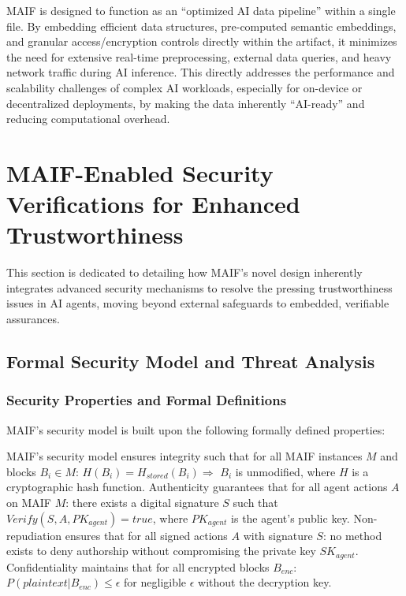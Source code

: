 \documentclass[conference]{IEEEtran}
\begin{document}
MAIF is designed to function as an ``optimized AI data pipeline'' within a single file. By embedding efficient data structures, pre-computed semantic embeddings, and granular access/encryption controls directly within the artifact, it minimizes the need for extensive real-time preprocessing, external data queries, and heavy network traffic during AI inference. This directly addresses the performance and scalability challenges of complex AI workloads, especially for on-device or decentralized deployments, by making the data inherently ``AI-ready'' and reducing computational overhead.

\section{MAIF-Enabled Security Verifications for Enhanced Trustworthiness}
\label{sec:security}

This section is dedicated to detailing how MAIF's novel design inherently integrates advanced security mechanisms to resolve the pressing trustworthiness issues in AI agents, moving beyond external safeguards to embedded, verifiable assurances.

\subsection{Formal Security Model and Threat Analysis}

\subsubsection{Security Properties and Formal Definitions}

MAIF's security model is built upon the following formally defined properties:

MAIF's security model ensures integrity such that for all MAIF instances $M$ and blocks $B_i \in M$: $H(B_i) = H_{stored}(B_i) \Rightarrow$ $B_i$ is unmodified, where $H$ is a cryptographic hash function. Authenticity guarantees that for all agent actions $A$ on MAIF $M$: there exists a digital signature $S$ such that $Verify(S, A, PK_{agent}) = true$, where $PK_{agent}$ is the agent's public key. Non-repudiation ensures that for all signed actions $A$ with signature $S$: no method exists to deny authorship without compromising the private key $SK_{agent}$. Confidentiality maintains that for all encrypted blocks $B_{enc}$: $P(plaintext | B_{enc}) \leq \epsilon$ for negligible $\epsilon$ without the decryption key.
\end{document}
